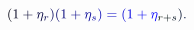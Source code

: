 \documentclass[12pt]{article}
\begin{document}
\makeatletter
\renewcommand*{\@textcolor}[3]{%
  \protect\leavevmode
  \begingroup
    \color#1{#2}#3%
  \endgroup
}
\makeatother
\begin{displaymath}
\mathcolor[RGB]{0,0,15}{(} \mathcolor[RGB]{0,0,30}{1} \mathcolor[RGB]{0,0,45}{+} \mathcolor[RGB]{0,0,60}{\eta} _ { \mathcolor[RGB]{0,0,75}{r} } \mathcolor[RGB]{0,0,90}{)} \mathcolor[RGB]{0,0,105}{(} \mathcolor[RGB]{0,0,120}{1} \mathcolor[RGB]{0,0,135}{+} \mathcolor[RGB]{0,0,150}{\eta} _ { \mathcolor[RGB]{0,0,165}{s} } \mathcolor[RGB]{0,0,180}{)} \mathcolor[RGB]{0,0,195}{=} \mathcolor[RGB]{0,0,210}{(} \mathcolor[RGB]{0,0,225}{1} \mathcolor[RGB]{0,0,240}{+} \mathcolor[RGB]{0,0,255}{\eta} _ { \mathcolor[RGB]{0,15,0}{r} \mathcolor[RGB]{0,15,15}{+} \mathcolor[RGB]{0,15,30}{s} } \mathcolor[RGB]{0,15,45}{)} \mathcolor[RGB]{0,15,60}{.}
\end{displaymath}
\end{document}
